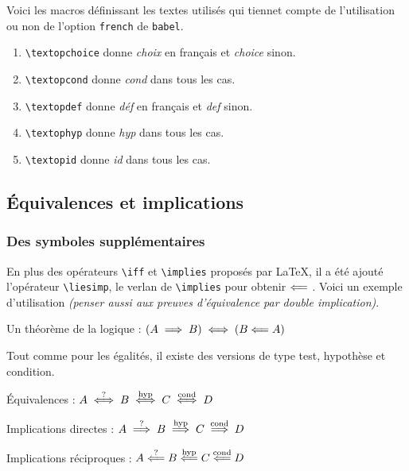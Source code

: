 \documentclass[12pt,a4paper]{article}
\theoremstyle{definition}
\begin{document}
Voici les macros définissant les textes utilisés qui tiennet compte de l'utilisation ou non de l'option \verb+french+ de \verb+babel+.

\begin{enumerate}
	\item \verb+\textopchoice+ donne \emph{\og choix \fg} en français et \emph{\og choice \fg} sinon.

	\item \verb+\textopcond+ donne \emph{\og cond \fg} dans tous les cas.

	\item \verb+\textopdef+ donne \emph{\og déf \fg} en français et \emph{\og def \fg} sinon.

	\item \verb+\textophyp+ donne \emph{\og hyp \fg} dans tous les cas.

	\item \verb+\textopid+ donne \emph{\og id \fg} dans tous les cas.
\end{enumerate}





    \subsection{Équivalences et implications}

	    \subsubsection{Des symboles supplémentaires}

En plus des opérateurs \verb+\iff+ et \verb+\implies+ proposés par \LaTeX{}, il a été ajouté l'opérateur \verb+\liesimp+, le verlan de \verb+\implies+ pour obtenir $\mathrel{\Longleftarrow}$ . Voici un exemple d'utilisation \emph{(penser aussi aux preuves d'équivalence par double implication)}.

\begin{tcblisting}{}
Un théorème de la logique : $(A \implies B) \iff (B \liesimp A)$
\end{tcblisting}


Tout comme pour les égalités, il existe des versions de type test, hypothèse et condition.

\begin{tcblisting}{}
Équivalences : $A \ifftest B \iffhyp C \iffcond D$

Implications directes : $A \impliestest B \implieshyp C \impliescond D$

Implications réciproques : $A \liesimptest B \liesimphyp C \liesimpcond D$
\end{tcblisting}
\end{document}
